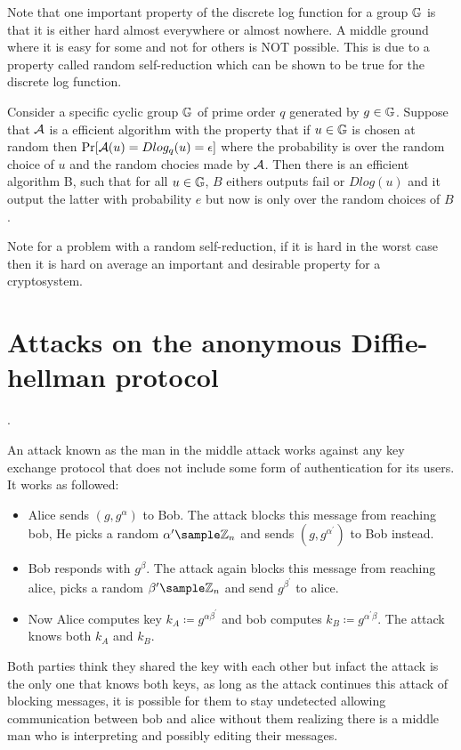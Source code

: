 Note that one important property of the discrete log function for a group \( \mathbb{G}\) is that it is either hard almost everywhere or almost nowhere. A middle ground where it is easy for some and not for others is NOT possible. This is due to a property called random self-reduction which can be shown to be true for the discrete log function. 

\begin{theorem}
    Consider a specific cyclic group \(\mathbb{G}\) of prime order \(q\) generated by \(g \in \mathbb{G}\). Suppose that \(\mathcal{A}\) is a efficient algorithm with the property that if \(u \in \mathbb{G}\) is chosen at random then \(\Pr[\mathcal{A}(u) = Dlog_q(u) = \epsilon ]\) where the probability is over the random choice of \(u\) and the random chocies made by \(\mathcal{A}\). Then there is an efficient algorithm B, such that for all \( u \in \mathbb{G}\), \(B\) eithers outputs fail  or \(Dlog(u)\)  and it output the latter with probability \(e\) but now is only over the random choices of \(B\).          
\end{theorem}

Note for a problem with a random self-reduction, if it is hard in the worst case then it is hard on average an important and desirable property for a cryptosystem. 

\section{Attacks on the anonymous Diffie-hellman protocol}. 

An attack known as the man in the middle attack works against any key exchange protocol that does not include some form of authentication for its users. It works as followed: 
\begin{itemize}
    \item Alice sends \((g, g^\alpha )\) to Bob.  The attack blocks this message from reaching bob, He picks a random \(\alpha^\prime \sample \Z_n\) and sends \((g, g^{\alpha^\prime })\) to Bob instead. 
    \item Bob responds with \(g^\beta \). The attack again blocks this message from reaching alice, picks a random \(\beta^\prime  \sample \Z_n \)  and send \(g^{\beta^\prime }\) to alice. 
    \item Now Alice computes key \(k_A \coloneqq g^{\alpha \beta^\prime }\)  and bob computes \(k_B \coloneqq g^{\alpha^\prime \beta }\). The attack knows both \(k_A\) and \(k_B\).   
\end{itemize}
Both parties think they shared the key with each other but infact the attack is the only one that knows both keys, as long as the attack continues this attack of blocking messages, it is possible for them to stay undetected allowing communication between bob and alice without them realizing there is a middle man who is interpreting and possibly editing their messages.

